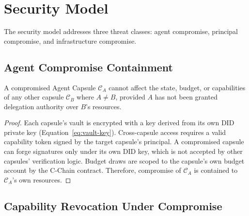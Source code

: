 

\section{Security Model}
\label{sec:security}

The security model addresses three threat classes: agent compromise, principal compromise, and infrastructure compromise.

\subsection{Agent Compromise Containment}

\begin{theorem}
A compromised Agent Capsule $\mathcal{C}_A$ cannot affect the state, budget, or capabilities of any other capsule $\mathcal{C}_B$ where $A \neq B$, provided $A$ has not been granted delegation authority over $B$'s resources.
\end{theorem}

\begin{proof}
Each capsule's vault is encrypted with a key derived from its own DID private key (Equation~\ref{eq:vault-key}). Cross-capsule access requires a valid capability token signed by the target capsule's principal. A compromised capsule can forge signatures only under its own DID key, which is not accepted by other capsules' verification logic. Budget draws are scoped to the capsule's own budget account by the C-Chain contract. Therefore, compromise of $\mathcal{C}_A$ is contained to $\mathcal{C}_A$'s own resources.
\end{proof}

\subsection{Capability Revocation Under Compromise}

